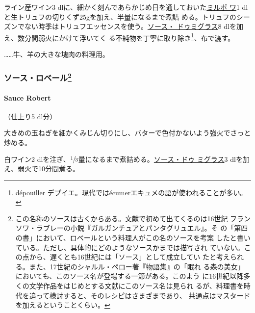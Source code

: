 
ライン産ワイン3
dlに、細かく刻んであらかじめ日を通しておいた\protect\hyperlink{mirepoix}{ミルポ
ワ}1 dlと生トリュフの切りくず25gを加え、半量になるまで煮詰
める。トリュフのシーズンでない時季はトリュフエッセンスを使う。\protect\hyperlink{sauce-demi-glace}{ソース・
ドゥミグラス}8 dlを加え、数分間弱火にかけて浮いてく
る不純物を丁寧に取り除き\footnote{dépouiller
  デプイエ。現代ではécumerエキュメの語が使われることが多い。}、布で漉す。

\ldots{}\ldots{}牛、羊の大きな塊肉の料理用。

\hypertarget{ux30bdux30fcux30b9ux30edux30d9ux30fcux30eb77}{%
\subsubsection[ソース・ロベール]{\texorpdfstring{ソース・ロベール\footnote{この名称のソースは古くからある。文献で初めて出てくるのは16世紀
  フランソワ・ラブレーの小説『ガルガンチュアとパンタグリュエル』。そ
  の「第四の書」において、ロベールという料理人がこの名のソースを考案
  したと書いている。ただし、具体的にどのようなソースかまでは描写され
  ていない。この点から、遅くとも16世紀には「ソース」として成立してい
  たと考えられる。また、17世紀のシャルル・ペロー著『物語集』の「眠れ
  る森の美女」においても、このソース名が登場する一節がある。このよう
  に16世紀以降多くの文学作品をはじめとする文献にこのソース名は見られ
  るが、料理書を時代を追って検討すると、そのレシピはさまざまであり、
  共通点はマスタードを加えるということくらい。}}{ソース・ロベール}}\label{ux30bdux30fcux30b9ux30edux30d9ux30fcux30eb77}}

\hypertarget{sauce-robert}{%
\paragraph{Sauce Robert}\label{sauce-robert}}


（仕上り5 dl分）

大きめの玉ねぎを細かくみじん切りにし、バターで色付かないよう強火でさっと炒める。

白ワイン2
dlを注ぎ、\(\sfrac{1}{3}\)量になるまで煮詰める。\protect\hyperlink{sauce-demi-glace}{ソース・ドゥ
ミグラス}3 dlを加え、弱火で10分間煮る。

